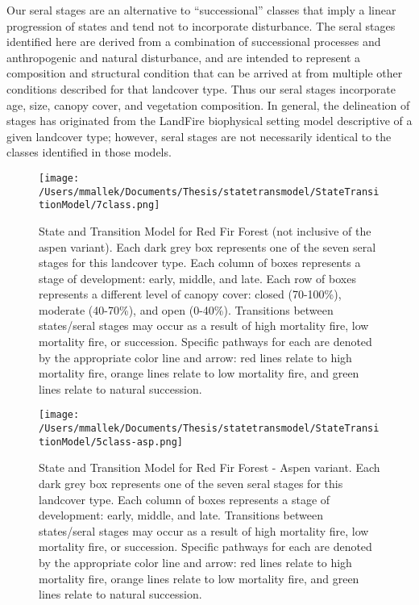 Our seral stages are an alternative to ``successional'' classes that imply a linear progression of states and tend not to incorporate disturbance. The seral stages identified here are derived from a combination of successional processes and anthropogenic and natural disturbance, and are intended to represent a composition and structural condition that can be arrived at from multiple other conditions described for that landcover type. Thus our seral stages incorporate age, size, canopy cover, and vegetation composition. In general, the delineation of stages has originated from the LandFire biophysical setting model descriptive of a given landcover type; however, seral stages are not necessarily identical to the classes identified in those models.

\begin{figure}[htbp]
\centering
\texttt{[image: /Users/mmallek/Documents/Thesis/statetransmodel/StateTransitionModel/7class.png]}
\caption{State and Transition Model for Red Fir Forest (not inclusive of the aspen variant). Each dark grey box represents one of the seven seral stages for this landcover type. Each column of boxes represents a stage of development: early, middle, and late. Each row of boxes represents a different level of canopy cover: closed (70-100\%), moderate (40-70\%), and open (0-40\%). Transitions between states/seral stages may occur as a result of high mortality fire, low mortality fire, or succession. Specific pathways for each are denoted by the appropriate color line and arrow: red lines relate to high mortality fire, orange lines relate to low mortality fire, and green lines relate to natural succession.} 
\label{transmodel_rfr}
\end{figure}

\begin{figure}[htbp]
\centering
\texttt{[image: /Users/mmallek/Documents/Thesis/statetransmodel/StateTransitionModel/5class-asp.png]}
\caption{State and Transition Model for Red Fir Forest - Aspen variant. Each dark grey box represents one of the seven seral stages for this landcover type. Each column of boxes represents a stage of development: early, middle, and late. Transitions between states/seral stages may occur as a result of high mortality fire, low mortality fire, or succession. Specific pathways for each are denoted by the appropriate color line and arrow: red lines relate to high mortality fire, orange lines relate to low mortality fire, and green lines relate to natural succession.} 
\label{transmodel_rfr-asp}
\end{figure}

